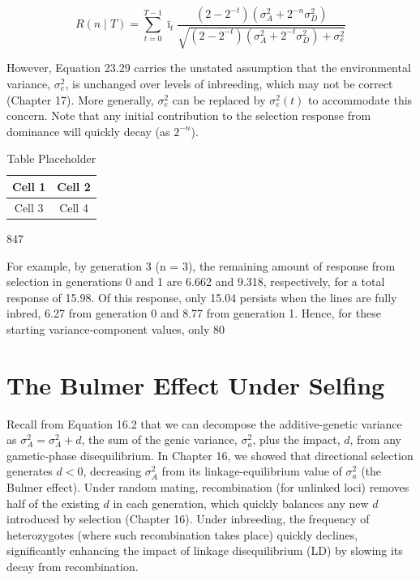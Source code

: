 \documentclass{article}
\begin{document}
\begin{equation}
R(n\mid T)=\sum_{t=0}^{T-1}\bar{\imath}_{t}\frac{\left(2-2^{-t}\right)\left(\sigma_{A}^{2}+2^{-n}\sigma_{D}^{2}\right)}{\sqrt{\left(2-2^{-t}\right)\left(\sigma_{A}^{2}+2^{-t}\sigma_{D}^{2}\right)+\sigma_{e}^{2}}}
\tag{23.29}
\label{eq:23_29}
\end{equation}

However, Equation 23.29 carries the unstated assumption that the environmental variance,  $ \sigma_e^2 $, is unchanged over levels of inbreeding, which may not be correct (Chapter 17). More generally,  $ \sigma_e^2 $ can be replaced by  $ \sigma_e^2(t) $ to accommodate this concern. Note that any initial contribution to the selection response from dominance will quickly decay (as  $ 2^{-n} $).

\begin{table}[h]
\centering
\begin{tabular}{|c|c|}
\hline
Cell 1 & Cell 2 \\
\hline
Cell 3 & Cell 4 \\
\hline
\end{tabular}
\caption{Table Placeholder}
\end{table}

847

For example, by generation 3 (n = 3), the remaining amount of response from selection in generations 0 and 1 are 6.662 and 9.318, respectively, for a total response of 15.98. Of this response, only 15.04 persists when the lines are fully inbred, 6.27 from generation 0 and 8.77 from generation 1. Hence, for these starting variance-component values, only 80%

\section{The Bulmer Effect Under Selfing}
Recall from Equation 16.2 that we can decompose the additive-genetic variance as  $ \sigma_A^2 = \sigma_A^2 + d $, the sum of the genic variance,  $ \sigma_a^2 $, plus the impact,  $ d $, from any gametic-phase disequilibrium. In Chapter 16, we showed that directional selection generates  $ d < 0 $, decreasing  $ \sigma_A^2 $ from its linkage-equilibrium value of  $ \sigma_a^2 $ (the Bulmer effect). Under random mating, recombination (for unlinked loci) removes half of the existing  $ d $ in each generation, which quickly balances any new  $ d $ introduced by selection (Chapter 16). Under inbreeding, the frequency of heterozygotes (where such recombination takes place) quickly declines, significantly enhancing the impact of linkage disequilibrium (LD) by slowing its decay from recombination.
\end{document}
